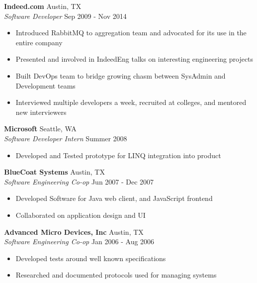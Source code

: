 \documentclass[a4paper]{article}
\begin{document}
\textbf{Indeed.com} \hfill Austin, TX\\
\textit{Software Developer} \hfill Sep 2009 - Nov 2014\\
\vspace{-1mm}
\begin{itemize} \itemsep 1pt
\item Introduced RabbitMQ to aggregation team and advocated for its use in the entire company
\item Presented and involved in IndeedEng talks on interesting engineering projects
\item Built DevOps team to bridge growing chasm between SysAdmin and Development teams
\item Interviewed multiple developers a week, recruited at colleges, and mentored new interviewers
\end{itemize}

\textbf{Microsoft} \hfill Seattle, WA\\
\textit{Software Developer Intern} \hfill Summer 2008\\
\vspace{-1mm}
\begin{itemize} \itemsep 1pt
\item Developed and Tested prototype for LINQ integration into product
\end{itemize}

\textbf{BlueCoat Systems} \hfill Austin, TX\\
\textit{Software Engineering Co-op} \hfill Jun 2007 - Dec 2007\\
\vspace{-1mm}
\begin{itemize} \itemsep 1pt
\item Developed Software for Java web client, and JavaScript frontend
\item Collaborated on application design and UI
\end{itemize}

\textbf{Advanced Micro Devices, Inc} \hfill Austin, TX\\
\textit{Software Engineering Co-op} \hfill Jan 2006 - Aug 2006\\
\vspace{-1mm}
\begin{itemize} \itemsep 1pt
\item Developed tests around well known specifications
\item Researched and documented protocols used for managing systems
\end{itemize}
\end{document}
